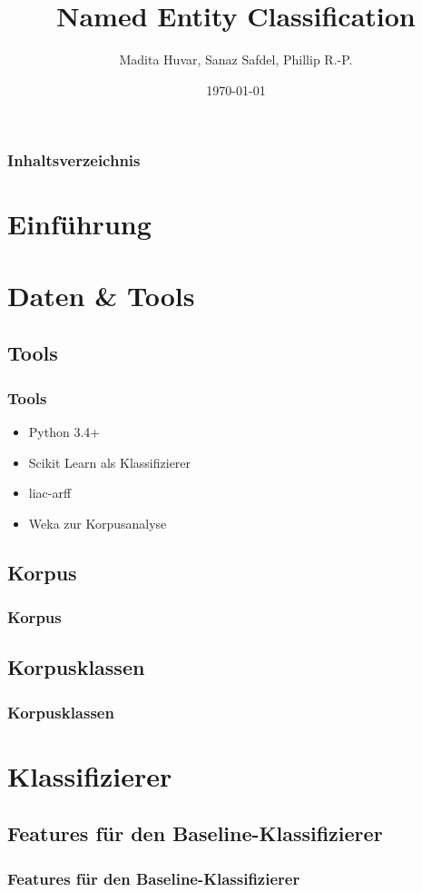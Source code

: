 \documentclass{beamer}
\title{Named Entity Classification}
\author{Madita Huvar, Sanaz Safdel, Phillip R.-P.}
\date{\today}
\begin{document}
\begin{frame}
\titlepage
\end{frame} 

\begin{frame}
\frametitle{Inhaltsverzeichnis}
\tableofcontents
\end{frame} 


\section{Einführung}
\section{Daten \& Tools}
	\subsection{Tools}
	\begin{frame}
			\frametitle{Tools}
			\begin{itemize}
				\item Python 3.4+
				\item Scikit Learn als Klassifizierer
				\item liac-arff
				\item Weka zur Korpusanalyse
			\end{itemize}
	\end{frame}
	\subsection{Korpus}
	\begin{frame}
			\frametitle{Korpus}
			
	\end{frame}
	\subsection{Korpusklassen}
	\begin{frame}
			\frametitle{Korpusklassen}
			
	\end{frame}


\section{Klassifizierer}
	\subsection{Features für den Baseline-Klassifizierer}
	\begin{frame}
		\frametitle{Features für den Baseline-Klassifizierer}
		
	\end{frame}
\end{document}
